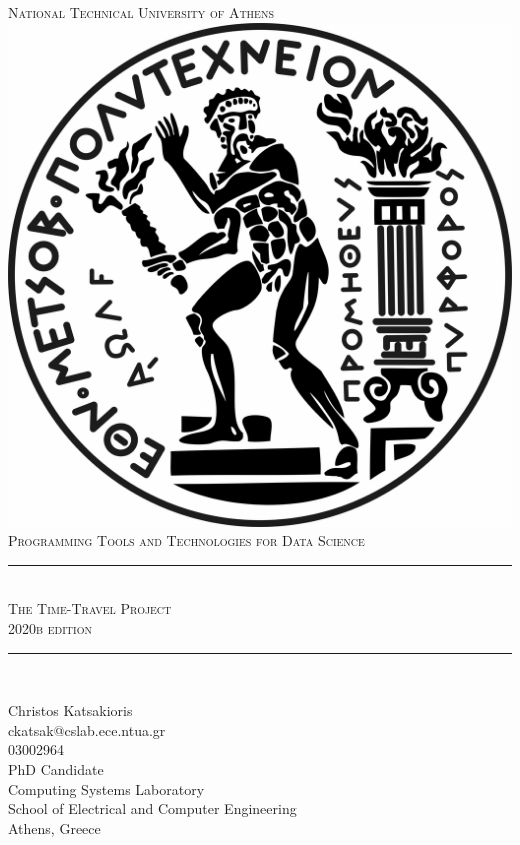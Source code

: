 \documentclass[12pt]{article}
\begin{document}
	\begin{titlepage}
		\newcommand{\HRule}{\rule{\linewidth}{0.1mm}}
		\center
		\textsc{\Large National Technical University of Athens}\\[0.5cm]
		\vspace{1cm}
		\includegraphics[scale=0.2]{images/pyrforos.jpg}\\[1cm]
		\textsc{\large Programming Tools and Technologies for Data Science}\\[0.5cm]

		\HRule \\[0.2cm]

		\textsc{\Large The Time-Travel Project \\ \large 2020b edition}\\

		\HRule \\[2cm]

		\vspace{0.5cm}

	 	\Large
		Christos Katsakioris\\
		ckatsak@cslab.ece.ntua.gr\\
		03002964\\
		\vspace{0.25cm}
		\large
		PhD Candidate\\
		Computing Systems Laboratory\\
		School of Electrical and Computer Engineering\\

		\vspace{3.5cm}
		\center Athens, Greece
		\\[2cm]
	\end{titlepage}
\end{document}
